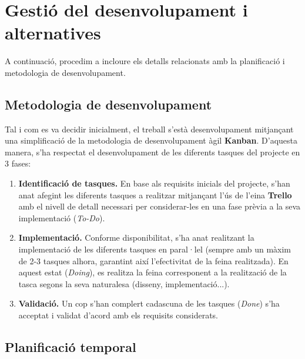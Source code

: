 
\chapter{Gestió del desenvolupament i alternatives} %

\label{GestioIDesenvolupament} %

A continuació, procedim a incloure els detalls relacionats amb la planificació i metodologia de desenvolupament.


\section{Metodologia de desenvolupament}

Tal i com es va decidir inicialment, el treball s'està desenvolupament mitjançant una simplificació de la metodologia de desenvolupament àgil \textbf{Kanban}. D'aquesta manera, s'ha respectat el desenvolupament de les diferents tasques del projecte en 3 fases:

\begin{enumerate}
\item \textbf{Identificació de tasques.} En base als requisits inicials del projecte, s'han anat afegint les diferents tasques a realitzar mitjançant l'ús de l'eina \textbf{Trello} amb el nivell de detall necessari per considerar-les en una fase prèvia a la seva implementació (\textit{To-Do}).
\item \textbf{Implementació.} Conforme disponibilitat, s'ha anat realitzant la implementació de les diferents tasques en paral·lel (sempre amb un màxim de 2-3 tasques alhora, garantint així l'efectivitat de la feina realitzada). En aquest estat (\textit{Doing}), es realitza la feina corresponent a la realització de la tasca segons la seva naturalesa (disseny, implementació...).
\item \textbf{Validació.} Un cop s'han complert cadascuna de les tasques (\textit{Done}) s'ha acceptat i validat d'acord amb els requisits considerats.
\end{enumerate}


\section{Planificació temporal}

